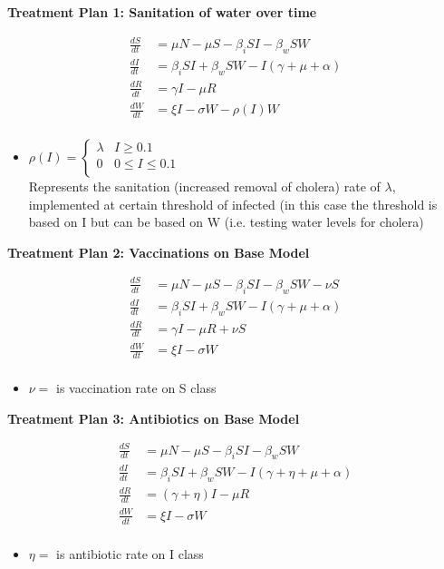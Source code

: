 \documentclass[]{article}
\begin{document}
\textbf{Treatment Plan 1: Sanitation of water over time}

\begin{align*}
	\frac{dS}{dt}&= \mu N - \mu S - \beta_i SI - \beta_w S W  \\
	\frac{dI}{dt}&= \beta_i S I + \beta_w S W - I (\gamma + \mu + \alpha) \\
	\frac{dR}{dt}&= \gamma I - \mu R \\
	\frac{dW}{dt}&= \xi I  - \sigma W - \rho (I) W\\
\end{align*}
	
\begin{itemize}
	\item $\rho (I)= \begin{cases}
			 			\lambda & I \geq 0.1 \\
			 			0 & 0 \leq I \leq 0.1 \\
			 			\end{cases}$\\
	Represents the sanitation (increased removal of cholera) rate of $\lambda$, implemented at certain threshold of infected (in this case the threshold is based on I but can be based on W (i.e. testing water levels for cholera) %
\end{itemize} 	 
		

\textbf{Treatment Plan 2: Vaccinations on Base Model}

\begin{align*}
	\frac{dS}{dt}&= \mu N - \mu S - \beta_i SI - \beta_w S W - \nu S \\
	\frac{dI}{dt}&= \beta_i S I + \beta_w S W - I (\gamma + \mu + \alpha) \\
	\frac{dR}{dt}&= \gamma I - \mu R + \nu S\\
	\frac{dW}{dt}&= \xi I  - \sigma W\\
\end{align*}

\begin{itemize}
	\item $\nu=$ is vaccination rate on S class
\end{itemize} 

\textbf{Treatment Plan 3: Antibiotics on Base Model}

\begin{align*}
	\frac{dS}{dt}&= \mu N - \mu S - \beta_i SI - \beta_w S W \\
	\frac{dI}{dt}&= \beta_i S I + \beta_w S W - I (\gamma +\eta + \mu + \alpha ) \\
	\frac{dR}{dt}&= (\gamma +\eta)I - \mu R \\
	\frac{dW}{dt}&= \xi I  - \sigma W\\
\end{align*}
\begin{itemize}
	\item $\eta=$ is antibiotic rate on I class
\end{itemize} 
\end{document}
